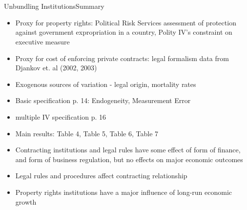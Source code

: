 \documentclass{beamer}
\begin{document}
\section{\cite{Acemoglu2003}}
\begin{frame}{Unbundling Institutions}{Summary}
\begin{itemize}
\item{Proxy for property rights: Political Risk Services assessment of protection against government expropriation in a country, Polity IV's constraint on executive measure}
\item{Proxy for cost of enforcing private contracts: legal formalism data from Djankov et. al (2002, 2003)}
\item{Exogenous sources of variation - legal origin, mortality rates}
\item{Basic specification p. 14: Endogeneity, Measurement Error}
\item{multiple IV specification p. 16}
\item{Main results: Table 4, Table 5, Table 6, Table 7}
\item{Contracting institutions and legal rules have some effect of form of finance, and form of business regulation, but no effects on major economic outcomes}
\item{Legal rules and procedures affect contracting relationship}
\item{Property rights institutions have a major influence of long-run economic growth}
\end{itemize}
\end{frame}




\end{document}
